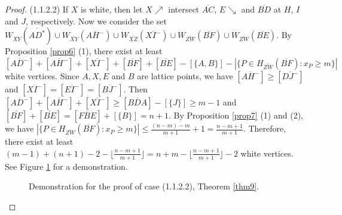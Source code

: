 \documentclass[preprint,12pt]{elsarticle}
\def\NEarrow#1{#1{\nearrow}}
\def\SEarrow#1{#1{\searrow}}
\begin{document}
{\begin{proof}
(1.1.2.2)
If $X$ is white, then let
$\NEarrow{X}$ intersect $\overline{AC}$, $\SEarrow{E}$ and $\overline{BD}$ at $H$, $I$ and $J$, respectively.
Now we consider the set
$W_{\overline{XY}}(\overline{AD^*})\cup W_{\overline{XY}}(\overline{AH^-})
\cup W_{\overline{XZ}}(\overline{XI^-})
\cup W_{\overline{ZW}}(\overline{BF})\cup W_{\overline{ZW}}(\overline{BE})$.
By Proposition \ref{prop6} (1), there exist at least
$[\overline{AD^-}]+[\overline{AH^-}]+[\overline{XI^-}]+[\overline{BF}]+[\overline{BE}]-[\{A,B\}]-
|\{P\in H_{\overline{ZW}}(\overline{BF}): x_P\ge m\}|$
white vertices.
Since $A,X,E$ and $B$ are lattice points,
we have $[\overline{AH^-}] \ge [\overline{DJ^-}]$ and
$[\overline{XI^-}]=[\overline{EI^-}]=[\overline{BJ^-}]$.
Then $[\overline{AD^-}]+[\overline{AH^-}]+[\overline{XI^-}] \ge [\overline{BDA}] - [\{J\}]\ge m-1$
and $[\overline{BF}]+[\overline{BE}]=[\overline{FBE}]+[\{B\}]=n+1$.
By Proposition \ref{prop7} (1) and (2), we have
$|\{P\in H_{\overline{ZW}}(\overline{BF}): x_P\ge m\}|\le\frac{(n-m)-m}{m+1}+1
=\frac{n-m+1}{m+1}$.
Therefore, there exist at least $(m-1)+(n+1)-2-\lfloor\frac{n-m+1}{m+1}\rfloor
=n+m-\lfloor\frac{n-m+1}{m+1}\rfloor-2$ white vertices.
See Figure \ref{fig8} for a demonstration.

\begin{figure}[htb]
\centering
{}
\caption{Demonstration for the proof of case (1.1.2.2), Theorem \ref{thm9}.} \label{fig8}
\end{figure}



\end{proof}}
\end{document}
